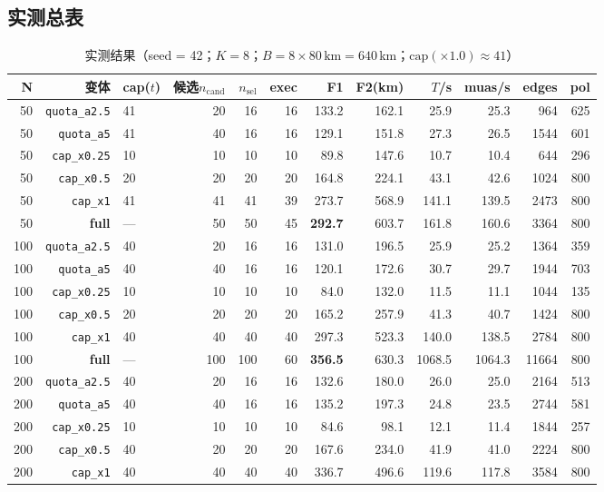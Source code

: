\documentclass[a4paper,11pt]{article}
\begin{document}
\subsection{实测总表}

\begin{table}[H]
\centering
\caption{实测结果（seed = 42；$K=8$；$B = 8 \times 80\,\mathrm{km} = 640$\,km；$\mathrm{cap}(\times 1.0) \approx 41$）}
\label{tab:main}
\footnotesize
\setlength{\tabcolsep}{3.5pt}
\begin{tabular}{rrlrrrrrrrrr}
\toprule
N & 变体 & cap($t$) & 候选$n_{\mathrm{cand}}$ & $n_{\mathrm{sel}}$ & exec & F1 & F2(km) & $T$/s & muas/s & edges & pol \\
\midrule
50 & \texttt{quota\_a2.5} & 41 & 20 & 16 & 16 & 133.2 & 162.1 & 25.9 & 25.3 & 964 & 625 \\
50 & \texttt{quota\_a5}   & 41 & 40 & 16 & 16 & 129.1 & 151.8 & 27.3 & 26.5 & 1544 & 601 \\
50 & \texttt{cap\_x0.25}  & 10 & 10 & 10 & 10 &  89.8 & 147.6 & 10.7 & 10.4 & 644 & 296 \\
50 & \texttt{cap\_x0.5}   & 20 & 20 & 20 & 20 & 164.8 & 224.1 & 43.1 & 42.6 & 1024 & 800 \\
50 & \texttt{cap\_x1}     & 41 & 41 & 41 & 39 & 273.7 & 568.9 & 141.1 & 139.5 & 2473 & 800 \\
50 & \textbf{full}        & --- & 50 & 50 & 45 & \textbf{292.7} & 603.7 & 161.8 & 160.6 & 3364 & 800 \\
\midrule
100 & \texttt{quota\_a2.5} & 40 & 20 & 16 & 16 & 131.0 & 196.5 & 25.9 & 25.2 & 1364 & 359 \\
100 & \texttt{quota\_a5}   & 40 & 40 & 16 & 16 & 120.1 & 172.6 & 30.7 & 29.7 & 1944 & 703 \\
100 & \texttt{cap\_x0.25}  & 10 & 10 & 10 & 10 &  84.0 & 132.0 & 11.5 & 11.1 & 1044 & 135 \\
100 & \texttt{cap\_x0.5}   & 20 & 20 & 20 & 20 & 165.2 & 257.9 & 41.3 & 40.7 & 1424 & 800 \\
100 & \texttt{cap\_x1}     & 40 & 40 & 40 & 40 & 297.3 & 523.3 & 140.0 & 138.5 & 2784 & 800 \\
100 & \textbf{full}        & --- & 100 & 100 & 60 & \textbf{356.5} & 630.3 & 1068.5 & 1064.3 & 11664 & 800 \\
\midrule
200 & \texttt{quota\_a2.5} & 40 & 20 & 16 & 16 & 132.6 & 180.0 & 26.0 & 25.0 & 2164 & 513 \\
200 & \texttt{quota\_a5}   & 40 & 40 & 16 & 16 & 135.2 & 197.3 & 24.8 & 23.5 & 2744 & 581 \\
200 & \texttt{cap\_x0.25}  & 10 & 10 & 10 & 10 &  84.6 &  98.1 & 12.1 & 11.4 & 1844 & 257 \\
200 & \texttt{cap\_x0.5}   & 40 & 20 & 20 & 20 & 167.6 & 234.0 & 41.9 & 41.0 & 2224 & 800 \\
200 & \texttt{cap\_x1}     & 40 & 40 & 40 & 40 & 336.7 & 496.6 & 119.6 & 117.8 & 3584 & 800 \\
\bottomrule
\end{tabular}
\end{table}
\end{document}
